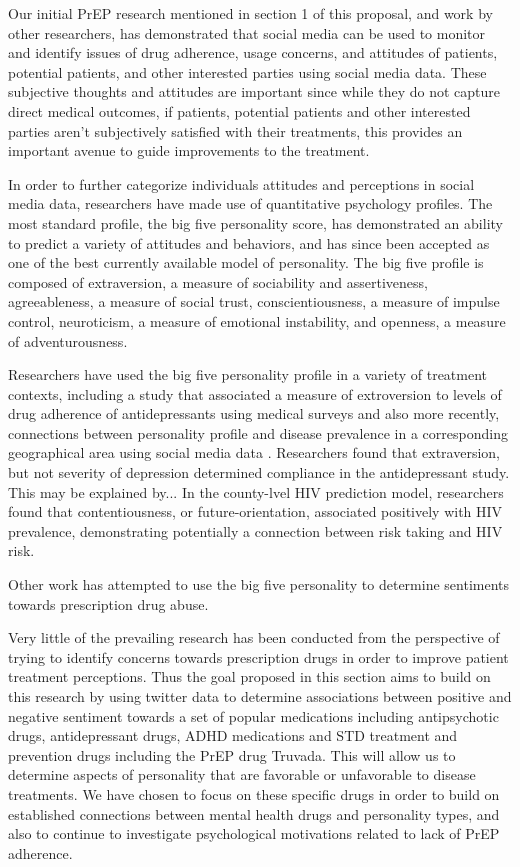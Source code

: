Our initial PrEP research mentioned in section 1 of this proposal, and work by other researchers, has demonstrated that social media can be used to monitor and identify issues of drug adherence, usage concerns, and attitudes of patients, potential patients, and other interested parties using social media data. These subjective thoughts and attitudes are important since while they do not capture direct medical outcomes, if patients, potential patients and other interested parties aren't subjectively satisfied with their treatments, this provides an important avenue to guide improvements to the treatment.

In order to further categorize individuals attitudes and perceptions in social media data, researchers have made use of quantitative psychology profiles. The most standard profile, the big five personality score\cite{gosling2003very}, has demonstrated an ability to predict a variety of attitudes and behaviors, and has since been accepted as one of the best currently available model of personality. The big five profile is composed of extraversion, a measure of sociability and assertiveness, agreeableness, a measure of social trust, conscientiousness, a measure of impulse control, neuroticism, a measure of emotional instability, and openness, a measure of adventurousness.

Researchers have used the big five personality profile in a variety of treatment contexts, including a study that associated a measure of extroversion to levels of drug adherence of antidepressants using medical surveys\cite{cohen20045} and also more recently, connections between personality profile and disease prevalence in a corresponding geographical area using social media data \cite{ireland2015future}. Researchers found that extraversion, but not severity of depression determined compliance in the antidepressant study. This may be explained by... In the county-lvel HIV prediction model, researchers found that contentiousness, or future-orientation, associated positively with HIV prevalence, demonstrating potentially a connection between risk taking and HIV risk.

Other work has attempted to use the big five personality to determine sentiments towards prescription drug abuse\cite{}. %

Very little of the prevailing research has been conducted from the perspective of trying to identify concerns towards prescription drugs in order to improve patient treatment perceptions. Thus the goal proposed in this section aims to build on this research by using twitter data to determine associations between positive and negative sentiment towards a set of popular medications including antipsychotic drugs, antidepressant drugs, ADHD medications and STD treatment and prevention drugs including the PrEP drug Truvada. This will allow us to determine aspects of personality that are favorable or unfavorable to disease treatments. We have chosen to focus on these specific drugs in order to build on established connections between mental health drugs and personality types, and also to continue to investigate psychological motivations related to lack of PrEP adherence.

